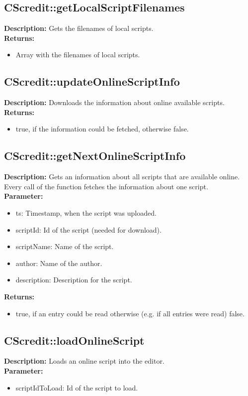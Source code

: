 \subsection{CScredit::getLocalScriptFilenames}
\textbf{Description:} Gets the filenames of local scripts.\\
\textbf{Returns:}
\begin{itemize}
\item Array with the filenames of local scripts.
\end{itemize}

\subsection{CScredit::updateOnlineScriptInfo}
\textbf{Description:} Downloads the information about online available scripts.\\
\textbf{Returns:}
\begin{itemize}
\item true, if the information could be fetched, otherwise false.
\end{itemize}

\subsection{CScredit::getNextOnlineScriptInfo}
\textbf{Description:} Gets an information about all scripts that are available online. Every call of the function fetches the information about one script.\\
\textbf{Parameter:}
\begin{itemize}
\item ts: Timestamp, when the script was uploaded.
\item scriptId: Id of the script (needed for download).
\item scriptName: Name of the script.
\item author: Name of the author.
\item description: Description for the script.
\end{itemize}
\textbf{Returns:}
\begin{itemize}
\item true, if an entry could be read otherwise (e.g. if all entries were read) false.
\end{itemize}

\subsection{CScredit::loadOnlineScript}
\textbf{Description:} Loads an online script into the editor.\\
\textbf{Parameter:}
\begin{itemize}
\item scriptIdToLoad: Id of the script to load.
\end{itemize}

